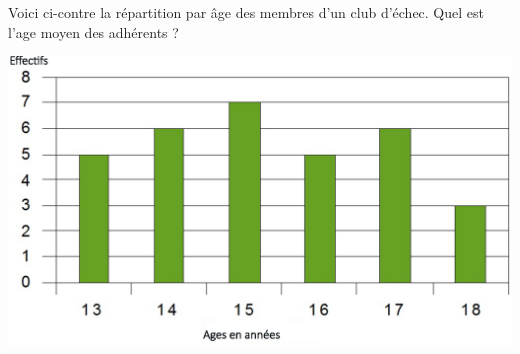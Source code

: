 
\begin{multicols}{2}
Voici ci-contre la répartition par âge des membres d'un club d'échec.
Quel est l'age moyen des adhérents ?

\includegraphics[scale=0.35]{Stat-cours1.eps} 
\end{multicols}	